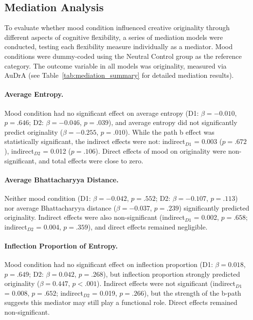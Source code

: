 \documentclass[../MA_Thesis.tex]{subfiles}
\begin{document}
\begin{appendix}
\newpage
\section{Mediation Analysis}
\label{appendix: mediation_analysis_results}
To evaluate whether mood condition influenced creative originality through different aspects of cognitive flexibility, a series of mediation models were conducted, testing each flexibility measure individually as a mediator. Mood conditions were dummy-coded using the Neutral Control group as the reference category. The outcome variable in all models was originality, measured via AuDrA (see Table~\ref{tab:mediation_summary} for detailed mediation results).

\paragraph{Average Entropy.}
Mood condition had no significant effect on average entropy (D1: $\beta = -0.010$, $p = .646$; D2: $\beta = -0.046$, $p = .039$), and average entropy did not significantly predict originality ($\beta = -0.255$, $p = .010$). While the path b effect was statistically significant, the indirect effects were not: indirect$_{D1}$ = 0.003 ($p = .672$), indirect$_{D2}$ = 0.012 ($p = .106$). Direct effects of mood on originality were non-significant, and total effects were close to zero.

\paragraph{Average Bhattacharyya Distance.}
Neither mood condition (D1: $\beta = -0.042$, $p = .552$; D2: $\beta = -0.107$, $p = .113$) nor average Bhattacharyya distance ($\beta = -0.037$, $p = .239$) significantly predicted originality. Indirect effects were also non-significant (indirect$_{D1}$ = 0.002, $p = .658$; indirect$_{D2}$ = 0.004, $p = .359$), and direct effects remained negligible.

\paragraph{Inflection Proportion of Entropy.}
Mood condition had no significant effect on inflection proportion (D1: $\beta = 0.018$, $p = .649$; D2: $\beta = 0.042$, $p = .268$), but inflection proportion strongly predicted originality ($\beta = 0.447$, $p < .001$). Indirect effects were not significant (indirect$_{D1}$ = 0.008, $p = .652$; indirect$_{D2}$ = 0.019, $p = .266$), but the strength of the b-path suggests this mediator may still play a functional role. Direct effects remained non-significant.


\end{appendix}
\end{document}
